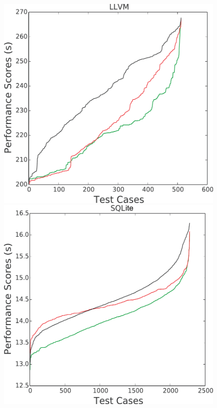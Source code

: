 \documentclass[conference]{IEEEtran}
\begin{document}
\begin{figure}[htbp!]
\begin{minipage}{0.30\linewidth}
\includegraphics[width=\linewidth]{_figs/LLVM.pdf}
\end{minipage}
\begin{minipage}{0.30\linewidth}
\includegraphics[width=\linewidth]{_figs/SQL.pdf}

\end{minipage}
\end{figure}
\end{document}
